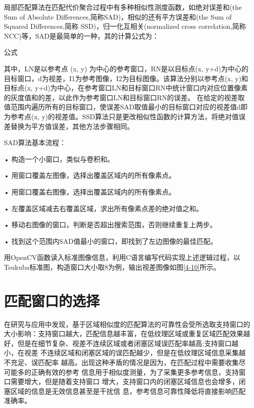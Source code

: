 
局部匹配算法在匹配代价聚合过程中有多种相似性测度函数，如绝对误差和(the Sum of Absolute Differences,简称SAD)，相似的还有平方误差和(the Sum of Squared Differences,简称 SSD)，归一化互相关(normalized cross correlation,简称 NCC)等，SAD是最简单的一种，其的计算公式为：

{{{公式}}}

其中，LN是以参考点 (x, y) 为中心的参考窗口，RN是以目标点(x, y+d)为中心的目标窗口，d为视差，I1为参考图像，I2为目标图像。该算法分别以参考点(x, y)和目标点(x, y+d)为中心，在参考窗口LN和目标窗口RN中统计窗口内对应位置像素的灰度值和的差，以此作为参考窗口LN和目标窗口RN的误差。
在给定的视差取值范围内遍历所有的目标窗口，使误差SAD取值最小的目标窗口对应的视差值d即为参考点(x, y)的视差值。SSD算法只是更改相似性函数的计算方法，将绝对值误差替换为平方值误差，其他方法步骤相同。


SAD算法基本流程：

•  构造一个小窗口，类似与卷积和。

•  用窗口覆盖左图像，选择出覆盖区域内的所有像素点。 

•  用窗口覆盖右图像，选择出覆盖区域内的所有像素点。

•  左覆盖区域减去右覆盖区域，求出所有像素点差的绝对值之和。

•  移动右图像的窗口，判断是否超出搜索范围，否则继续重复上两步。

•  找到这个范围内SAD值最小的窗口，即找到了左边图像的最佳匹配。

用OpenCV函数读入标准图像信息，利用C语言编写代码实现上述逻辑过程，以Tsukuba标准图，构造窗口大小取8为例，输出视差图像如图\ref{4-10}所示。


\section{匹配窗口的选择}

在研究与应用中发现，基于区域相似度的匹配算法的可靠性会受所选取支持窗口的大小影响：支持窗口越大，匹配信息越丰富，在低纹理区域或重复区域匹配效果越好，但是在细节复杂、视差不连续区域或者闭塞区域误匹配率越高;支持窗口越小，在视差
不连续区域和闭塞区域的误匹配越少，但是在低纹理区域信息采集越不充足、误匹配率
越高。出现这种矛盾的情况是因为，在匹配过程中需要收集尽可能多的正确有效的参考
信息用于相似度测量，为了采集更多参考信息，支持窗口需要增大，但是随着支持窗口
增大，支持窗口内的闭塞区域信息也会增多，闭塞区域的信息是无效信息甚至是干扰信
息，参考信息可靠性降低将直接影响匹配准确率。

